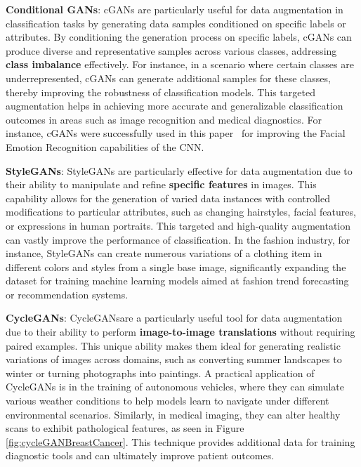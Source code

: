 \textbf{Conditional GANs}: cGANs are particularly useful for data augmentation in classification tasks by generating data samples conditioned on specific labels or attributes. By conditioning the generation process on specific labels, cGANs can produce diverse and representative samples across various classes, addressing \textbf{class imbalance} effectively.  For instance, in a scenario where certain classes are underrepresented, cGANs can generate additional samples for these classes, thereby improving the robustness of classification models. This targeted augmentation helps in achieving more accurate and generalizable classification outcomes in areas such as image recognition and medical diagnostics. For instance, cGANs were successfully used in this paper~\cite{cGANSAugmentation} for improving the Facial Emotion Recognition capabilities of the CNN.

\textbf{StyleGANs}: StyleGANs are particularly effective for data augmentation due to their ability to manipulate and refine \textbf{specific features} in images. This capability allows for the generation of varied data instances with controlled modifications to particular attributes, such as changing hairstyles, facial features, or expressions in human portraits. This targeted and high-quality augmentation can vastly improve the performance of classification. In the fashion industry, for instance, StyleGANs can create numerous variations of a clothing item in different colors and styles from a single base image, significantly expanding the dataset for training machine learning models aimed at fashion trend forecasting or recommendation systems. 

\textbf{CycleGANs}: CycleGANsare a particularly useful tool for data augmentation due to their ability to perform \textbf{image-to-image translations} without requiring paired examples. This unique ability makes them ideal for generating realistic variations of images across domains, such as converting summer landscapes to winter or turning photographs into paintings. A practical application of CycleGANs is in the training of autonomous vehicles, where they can simulate various weather conditions to help models learn to navigate under different environmental scenarios. Similarly, in medical imaging, they can alter healthy scans to exhibit pathological features, as seen in Figure \ref{fig:cycleGANBreastCancer}. This technique provides additional data for training diagnostic tools and can ultimately improve patient outcomes.

